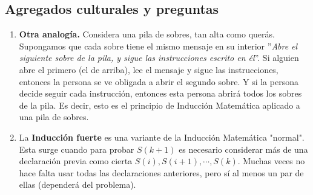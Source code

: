 \subsection{Agregados culturales y preguntas}
{
    \begin{enumerate}
        \item { \textbf{Otra analogía.}
        Considera una pila de sobres, tan alta como querás.
        Supongamos que cada sobre tiene el mismo mensaje en su interior ''\textit{Abre el siguiente sobre de la pila, y sigue las instrucciones escrito en él}''.
        Si alguien abre el primero (el de arriba), lee el mensaje y sigue las instrucciones, entonces la persona se ve obligada a abrir el segundo sobre.
        Y si la persona decide seguir cada instrucción, entonces esta persona abrirá todos los sobres de la pila.
        Es decir, esto es el principio de Inducción Matemática aplicado a una pila de sobres.}

        \item La \textbf{Inducción fuerte} es una variante de la Inducción Matemática "normal". Esta surge cuando para probar $S(k + 1)$ es necesario considerar más de una declaración previa como cierta $S(i), S(i + 1), \cdots, S(k)$. Muchas veces no hace falta usar todas las declaraciones anteriores, pero sí al menos un par de ellas (dependerá del problema).
    \end{enumerate}
}


